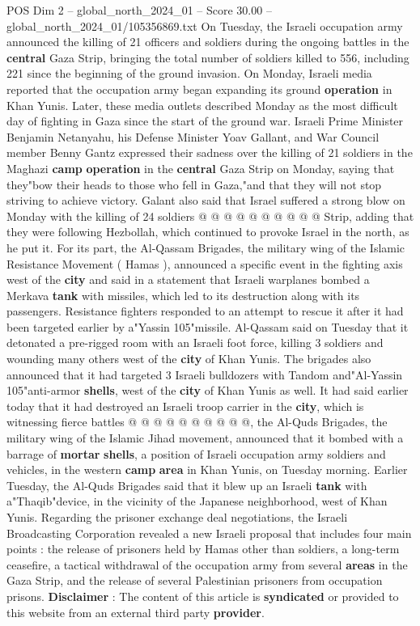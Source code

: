 \begin{textsample}{POS Dim 2 – global\_north\_2024\_01 – Score 30.00 – global\_north\_2024\_01/105356869.txt}
On Tuesday, the Israeli occupation army announced the killing of 21 officers and soldiers during the ongoing battles in the \textbf{central} Gaza Strip, bringing the total number of soldiers killed to 556, including 221 since the beginning of the ground invasion.
On Monday, Israeli media reported that the occupation army began expanding its ground \textbf{operation} in Khan Yunis.
Later, these media outlets described Monday as the most difficult day of fighting in Gaza since the start of the ground war.
Israeli Prime Minister Benjamin Netanyahu, his Defense Minister Yoav Gallant, and War Council member Benny Gantz expressed their sadness over the killing of 21 soldiers in the Maghazi \textbf{camp} \textbf{operation} in the \textbf{central} Gaza Strip on Monday, saying that they"bow their heads to those who fell in Gaza,"and that they will not stop striving to achieve victory.
Galant also said that Israel suffered a strong blow on Monday with the killing of 24 soldiers @ @ @ @ @ @ @ @ @ @ Strip, adding that they were following Hezbollah, which continued to provoke Israel in the north, as he put it.
For its part, the Al-Qassam Brigades, the military wing of the Islamic Resistance Movement ( Hamas ), announced a specific event in the fighting axis west of the \textbf{city} and said in a statement that Israeli warplanes bombed a Merkava \textbf{tank} with missiles, which led to its destruction along with its passengers.
Resistance fighters responded to an attempt to rescue it after it had been targeted earlier by a"Yassin 105"missile.
Al-Qassam said on Tuesday that it detonated a pre-rigged room with an Israeli foot force, killing 3 soldiers and wounding many others west of the \textbf{city} of Khan Yunis.
The brigades also announced that it had targeted 3 Israeli bulldozers with Tandom and"Al-Yassin 105"anti-armor \textbf{shells}, west of the \textbf{city} of Khan Yunis as well.
It had said earlier today that it had destroyed an Israeli troop carrier in the \textbf{city}, which is witnessing fierce battles @ @ @ @ @ @ @ @ @ @, the Al-Quds Brigades, the military wing of the Islamic Jihad movement, announced that it bombed with a barrage of \textbf{mortar} \textbf{shells}, a position of Israeli occupation army soldiers and vehicles, in the western \textbf{camp} \textbf{area} in Khan Yunis, on Tuesday morning.
Earlier Tuesday, the Al-Quds Brigades said that it blew up an Israeli \textbf{tank} with a"Thaqib"device, in the vicinity of the Japanese neighborhood, west of Khan Yunis.
Regarding the prisoner exchange deal negotiations, the Israeli Broadcasting Corporation revealed a new Israeli proposal that includes four main points : the release of prisoners held by Hamas other than soldiers, a long-term ceasefire, a tactical withdrawal of the occupation army from several \textbf{areas} in the Gaza Strip, and the release of several Palestinian prisoners from occupation prisons. \textbf{Disclaimer} : The content of this article is \textbf{syndicated} or provided to this website from an external third party \textbf{provider}.

\end{textsample}
